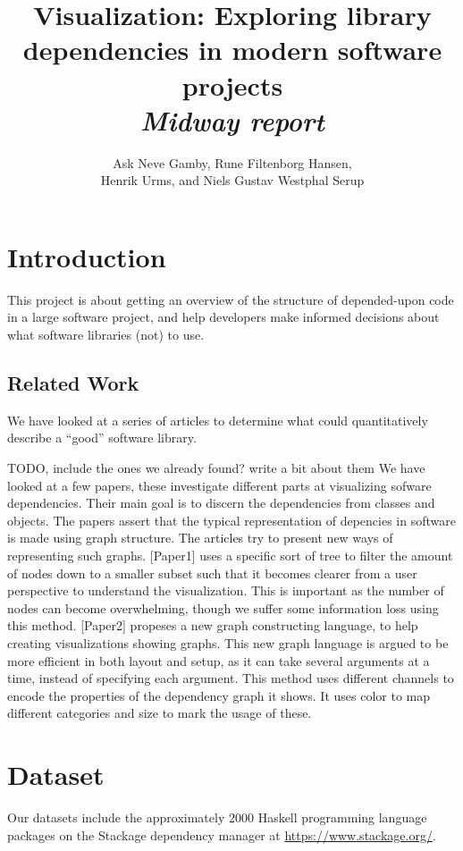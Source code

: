 \documentclass[a4paper,12pt]{article}
\title{\textbf{Visualization}: Exploring library dependencies in modern software projects\\\emph{Midway report}}
\author{Ask Neve Gamby, Rune Filtenborg Hansen,\\
Henrik Urms, and Niels Gustav Westphal Serup}
\begin{document}
\maketitle

\section{Introduction}

This project is about getting an overview of the structure of depended-upon code
in a large software project, and help developers make informed decisions about
what software libraries (not) to use.


\subsection{Related Work}

We have looked at a series of articles to determine what could quantitatively
describe a ``good'' software library.

TODO, include the ones we already found? write a bit about them
We have looked at a few papers, these investigate different parts at visualizing sofware dependencies.
Their main goal is to discern the dependencies from classes and objects. The papers assert
that the typical representation of depencies in software is made using graph structure.
The articles try to present new ways of representing such graphs. [Paper1] uses a specific
sort of tree to filter the amount of nodes down to a smaller subset such that it becomes
clearer from a user perspective to understand the visualization. This is important as the
number of nodes can become overwhelming, though we suffer some information loss using this
method. [Paper2] propeses a new graph constructing language, to help creating visualizations
showing graphs. This new graph language is argued to be more efficient in both layout and
setup, as it can take several arguments at a time, instead of specifying each argument.
This method uses different channels to encode the properties of the dependency graph it
shows. It uses color to map different categories and size to mark the usage of these.

\section{Dataset}

Our datasets include the approximately 2000 Haskell programming language
packages on the Stackage dependency manager at \url{https://www.stackage.org/}.
\end{document}
